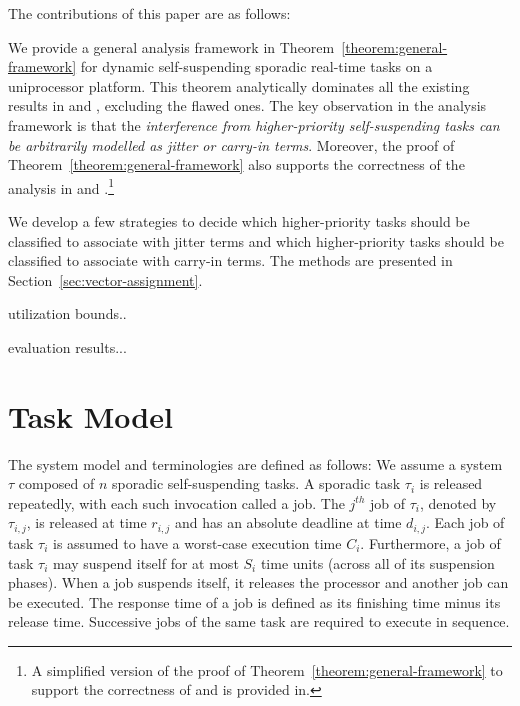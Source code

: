 \documentclass[10pt,conference,preprint]{IEEEtran}
\begin{document}
The contributions of this paper are as follows:
\begin{compactitem}
\item We provide a general analysis framework in
  Theorem~\ref{theorem:general-framework} for dynamic self-suspending
  sporadic real-time tasks on a uniprocessor platform. This theorem analytically
  dominates all the existing results in
  \cite{BletsasReport2015,huangpass:dac2015} and \cite[Pages
  164-165]{Liu:2000:RS:518501}, excluding the flawed ones. The key observation in the analysis
  framework is that the \emph{interference from higher-priority
    self-suspending tasks can be arbitrarily modelled as jitter or
    carry-in terms}. Moreover, the proof of
  Theorem~\ref{theorem:general-framework} also supports the
  correctness of the analysis in \cite[Pages
  164-165]{Liu:2000:RS:518501} and
  \cite[Page 267]{DBLP:conf/rtss/RajkumarSL88}.\footnote{A simplified
    version of the proof of Theorem~\ref{theorem:general-framework} to
    support the correctness of \cite[Pages
  164-165]{Liu:2000:RS:518501} and \cite[Page 267]{DBLP:conf/rtss/RajkumarSL88} is
  provided in\cite{ChenHuangNelissen}. }
\item We develop a few strategies to decide which higher-priority
  tasks should be classified to associate with jitter terms and which
  higher-priority tasks should be classified to associate with carry-in
  terms. The methods are presented in
  Section~\ref{sec:vector-assignment}.
\item utilization bounds..
\item evaluation results...
\end{compactitem}




\section{Task Model}




The system model and terminologies are defined as follows: We assume a system $\tau$ composed of $n$ sporadic self-suspending tasks. A sporadic task $\tau_i$ is released repeatedly, with each such invocation called a
job. The $j^{th}$ job of $\tau_i$, denoted by $\tau_{i,j}$, is released
at time $r_{i,j}$ and has an absolute deadline at time $d_{i,j}$. Each
job of task $\tau_i$ is assumed to have a worst-case execution time $C_i$. Furthermore, a job of task $\tau_i$ may suspend itself for at most $S_i$ time units (across all of its suspension phases). When a job suspends itself, it releases the processor and another job can be executed. The response time of a job is defined as its finishing time minus its release
time. Successive jobs of the same task are required to execute in
sequence. 
\end{document}
